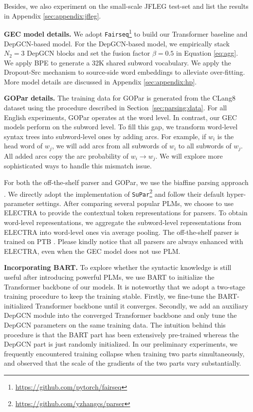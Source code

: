 \documentclass[11pt]{article}
\begin{document}
Besides, we also experiment on the small-scale JFLEG test-set \cite{napoles2017jfleg} and list the results in Appendix \ref{sec:appendix:jfleg}.

\textbf{GEC model details.}
We adopt \texttt{Fairseq}\footnote{\url{https://github.com/pytorch/fairseq}} \citep{ott2019fairseq} to build our Transformer baseline and DepGCN-based model. 
For the DepGCN-based model, we empirically stack $N_2 = 3$ DepGCN blocks and set the fusion factor $\beta = 0.5$ in Equation \ref{eq:agg}. 
We apply BPE \citep{sennrich-etal-2016-neural} to generate a 32K shared subword vocabulary. 
We apply the Dropout-Src mechanism \cite{junczys2018approaching} to source-side word embeddings  
to alleviate over-fitting. 
More model details are discussed in Appendix \ref{sec:appendix:hp}.


\textbf{GOPar details.} 
The training data for GOPar is generated from the CLang8 dataset \citep{rothe2021recipe} using the procedure described in Section~\ref{sec:parsing:data}. 
For all English experiments, GOPar operates at the word level. 
In contrast, our GEC models perform on the subword level. To fill this gap, we transform word-level syntax trees into subword-level ones by adding arcs. For example, if $w_i$ is the head word of $w_j$, we will 
add arcs from all subwords of $w_i$ to all subwords of $w_j$. All added arcs copy the arc probability of $w_i \rightarrow w_j$. We will explore more sophisticated ways to handle this mismatch  issue. 



For both the off-the-shelf parser and GOPar, we use the biaffine parsing approach \citep{DBLP:conf/iclr/DozatM17}.
We directly adopt the implementation of  \texttt{SuPar}\footnote{\url{https://github.com/yzhangcs/parser}} \citep{DBLP:conf/acl/ZhangLZ20} and follow their default hyper-parameter settings. 
After comparing several popular PLMs, 
we choose to use 
ELECTRA \citep{DBLP:conf/iclr/ClarkLLM20} to provide the contextual token representations for parsers. 
To obtain word-level representations, we aggregate the subword-level representations from ELECTRA into word-level ones via average pooling. 
The off-the-shelf parser is trained on PTB \cite{marcinkiewicz1994building}. 
Please kindly notice that all parsers are always enhanced with ELECTRA, even when the GEC model does not use PLM.  




\textbf{Incorporating BART.} 
To explore whether the syntactic knowledge is still useful after introducing powerful PLMs, we use BART \citep{lewis2020bart} to initialize the Transformer backbone of our models.
It is noteworthy that we adopt a two-stage training procedure to keep the training stable. Firstly, we fine-tune the BART-initialized Transformer backbone until it converges. Secondly, we add an auxiliary DepGCN module into the converged Transformer backbone and only tune the DepGCN parameters on the same training data. The intuition behind this procedure is that the BART part has been extensively pre-trained whereas the DepGCN part is just randomly initialized. In our preliminary experiments, we frequently encountered training collapse when training two parts simultaneously, and observed that the scale of the gradients of the two parts vary substantially.
\end{document}
